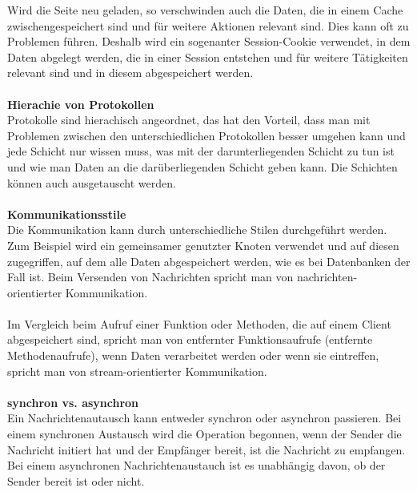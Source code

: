 \documentclass[a4paper,12pt]{article}
\begin{document}
Wird die Seite neu geladen, so verschwinden auch die Daten, die in einem Cache zwischengespeichert sind und für weitere Aktionen relevant sind. Dies kann oft zu Problemen führen. Deshalb wird ein sogenanter Session-Cookie verwendet, in dem Daten abgelegt werden, die in einer Session entstehen und für weitere Tätigkeiten relevant sind und in diesem abgespeichert werden.\\ \\
\textbf{Hierachie von Protokollen\\}
Protokolle sind hierachisch angeordnet, das hat den Vorteil, dass man mit Problemen zwischen den unterschiedlichen Protokollen besser umgehen kann und jede Schicht nur wissen muss, was mit der darunterliegenden Schicht zu tun ist und wie man Daten an die darüberliegenden Schicht geben kann. Die Schichten können auch ausgetauscht werden.
\\\\
\textbf{Kommunikationsstile\\}
Die Kommunikation kann durch unterschiedliche Stilen durchgeführt werden. Zum Beispiel wird ein gemeinsamer genutzter Knoten verwendet und auf diesen zugegriffen, auf dem alle Daten abgespeichert werden, wie es bei Datenbanken der Fall ist. Beim Versenden von Nachrichten spricht man von nachrichten-orientierter Kommunikation.\\\\
Im Vergleich beim Aufruf einer Funktion oder Methoden, die auf einem Client abgespeichert sind,
spricht man von entfernter Funktionsaufrufe (entfernte Methodenaufrufe), wenn Daten verarbeitet werden oder wenn sie eintreffen, spricht man von stream-orientierter Kommunikation.\\\\
\textbf{synchron vs. asynchron\\}
Ein Nachrichtenautausch kann entweder synchron oder asynchron passieren. Bei einem synchronen Austausch wird die Operation begonnen, wenn der Sender die Nachricht initiert hat und der Empfänger bereit, ist die Nachricht zu empfangen. Bei einem asynchronen Nachrichtenaustauch ist es unabhängig davon, ob der Sender bereit ist oder nicht. 
\newpage
\end{document}
